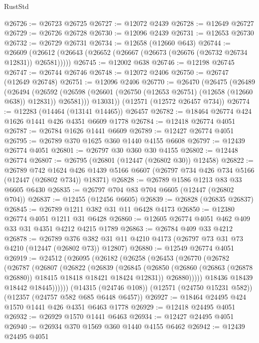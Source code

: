 \begin{lexlean}{RustStd}
\begin{coremodule}
@26726 := @26723 @26725
@26727 := @12072 @2439
@26728 := @12649 @26727
@26729 := @26726 @26728
@26730 := @12096 @2439
@26731 := @12653 @26730
@26732 := @26729 @26731
@26734 := @12658 (@12660 @643)
@26744 := @26609 (@26612 (@26643 (@26652 (@26667 (@26673 (@26676 (@26732 @26734 @12831)) @26581)))))
@26745 := @12002 @638
@26746 := @12198 @26745
@26747 := @26744 @26746
@26748 := @12072 @2406
@26750 := @26747 (@12649 @26748)
@26751 := @12096 @2406
@26770 := @26470
    (@26475
      (@26489
        (@26494
          (@26592 (@26598 (@26601 (@26750 (@12653 @26751) (@12658 (@12660 @638)) @12831)) @26581)))
        @13031))
    (@12571 (@12572 @26457 @734))
@26774 := @12283 (@14464 (@13141 @14465)) @26457
@26782 := @18464 @26774 @424 @1626 @1441 @426 @4351 @6609 @1778
@26784 := @12418 @26774 @4051
@26787 := @26784 @1626 @1441 @6609
@26789 := @12427 @26774 @4051
@26795 := @26789 @370 @1625 @360 @1440 @4155 @6608
@26797 := @12439 @26774 @4051
@26801 := @26797 @30 @360 @30 @4155
@26802 := @12448 @26774
@26807 := @26795 (@26801 (@12447 (@26802 @30)) @12458)
@26822 := @26789
    @742
    @1624
    @426
    @1439
    @5166
    @6607
    (@26797 @734 @426 @734 @5166 (@12447 (@26802 @734)) @18371)
@26828 := @26789 @1586 @1213 @83 @33 @6605 @6430
@26835 := @26797 @704 @83 @704 @6605 (@12447 (@26802 @704))
@26837 := @12455 (@12456 @6605)
@26839 := @26828 (@26835 @26837)
@26845 := @26789 @1211 @382 @31 @11 @6428 @4173
@26850 := @12380 @26774 @4051 @1211 @31 @6428
@26860 := @12605 @26774 @4051 @462 @409 @33 @31 @4351 @4212 @4215 @1789
@26863 := @26784 @409 @33 @4212
@26878 := @26789
    @376
    @382
    @31
    @11
    @4210
    @4173
    (@26797 @73 @31 @73 @4210 (@12447 (@26802 @73)) @12807)
@26880 := @12549 @26774 @4051
@26919 := @24512
    (@26095
      (@26182
        (@26258
          (@26453
            (@26770
              (@26782
                (@26787
                  (@26807
                    (@26822
                      (@26839
                        (@26845
                          (@26850
                            (@26860 (@26863 (@26878 @26880)) @18415 @18418 @18421 @18424 @12831))
                          @26880)))))
                @18436
                @18439
                @18442
                @18445))))))
    (@14315 (@24746 @108))
    (@12571 (@24750 @15231 @582))
    (@12357 (@24757 @582 @685 @6448 @6457))
@26927 := @18464 @24495 @424 @1570 @1441 @426 @4351 @6463 @1778
@26929 := @12418 @24495 @4051
@26932 := @26929 @1570 @1441 @6463
@26934 := @12427 @24495 @4051
@26940 := @26934 @370 @1569 @360 @1440 @4155 @6462
@26942 := @12439 @24495 @4051

\end{coremodule}
\end{lexlean}
